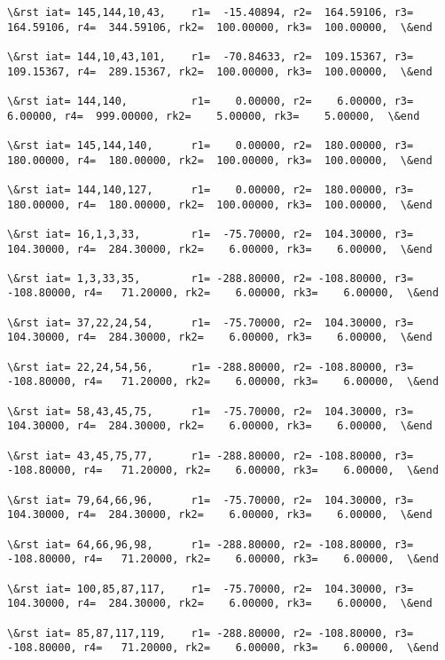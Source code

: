 \documentclass[11pt]{article}
\begin{document}
\begin{Verbatim}[commandchars=\\\{\}]
\&rst iat= 145,144,10,43,    r1=  -15.40894, r2=  164.59106, r3=  164.59106, r4=  344.59106, rk2=  100.00000, rk3=  100.00000,  \&end

\&rst iat= 144,10,43,101,    r1=  -70.84633, r2=  109.15367, r3=  109.15367, r4=  289.15367, rk2=  100.00000, rk3=  100.00000,  \&end

\&rst iat= 144,140,          r1=    0.00000, r2=    6.00000, r3=    6.00000, r4=  999.00000, rk2=    5.00000, rk3=    5.00000,  \&end

\&rst iat= 145,144,140,      r1=    0.00000, r2=  180.00000, r3=  180.00000, r4=  180.00000, rk2=  100.00000, rk3=  100.00000,  \&end

\&rst iat= 144,140,127,      r1=    0.00000, r2=  180.00000, r3=  180.00000, r4=  180.00000, rk2=  100.00000, rk3=  100.00000,  \&end

\&rst iat= 16,1,3,33,        r1=  -75.70000, r2=  104.30000, r3=  104.30000, r4=  284.30000, rk2=    6.00000, rk3=    6.00000,  \&end

\&rst iat= 1,3,33,35,        r1= -288.80000, r2= -108.80000, r3= -108.80000, r4=   71.20000, rk2=    6.00000, rk3=    6.00000,  \&end

\&rst iat= 37,22,24,54,      r1=  -75.70000, r2=  104.30000, r3=  104.30000, r4=  284.30000, rk2=    6.00000, rk3=    6.00000,  \&end

\&rst iat= 22,24,54,56,      r1= -288.80000, r2= -108.80000, r3= -108.80000, r4=   71.20000, rk2=    6.00000, rk3=    6.00000,  \&end

\&rst iat= 58,43,45,75,      r1=  -75.70000, r2=  104.30000, r3=  104.30000, r4=  284.30000, rk2=    6.00000, rk3=    6.00000,  \&end

\&rst iat= 43,45,75,77,      r1= -288.80000, r2= -108.80000, r3= -108.80000, r4=   71.20000, rk2=    6.00000, rk3=    6.00000,  \&end

\&rst iat= 79,64,66,96,      r1=  -75.70000, r2=  104.30000, r3=  104.30000, r4=  284.30000, rk2=    6.00000, rk3=    6.00000,  \&end

\&rst iat= 64,66,96,98,      r1= -288.80000, r2= -108.80000, r3= -108.80000, r4=   71.20000, rk2=    6.00000, rk3=    6.00000,  \&end

\&rst iat= 100,85,87,117,    r1=  -75.70000, r2=  104.30000, r3=  104.30000, r4=  284.30000, rk2=    6.00000, rk3=    6.00000,  \&end

\&rst iat= 85,87,117,119,    r1= -288.80000, r2= -108.80000, r3= -108.80000, r4=   71.20000, rk2=    6.00000, rk3=    6.00000,  \&end


\end{Verbatim}
\end{document}
